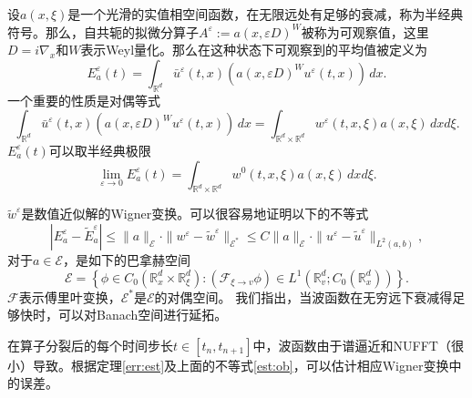 设$a(x,\xi)$是一个光滑的实值相空间函数，在无限远处有足够的衰减，称为半经典符号。那么，自共轭的拟微分算子$A^\varepsilon:=a(x,\varepsilon D)^W$被称为可观察值，这里$D=i\nabla_x$和$W$表示Weyl量化。那么在这种状态下可观察到的平均值被定义为
\begin{equation}
E^\varepsilon_a(t)=\int_{\mathbb{R}^d}\bar{u}^\varepsilon(t,x)(a(x,\varepsilon D)^W u^\varepsilon(t,x))\,dx.
\end{equation}
一个重要的性质是对偶等式
\begin{equation}
\int_{\mathbb{R}^d}\bar{u}^\varepsilon(t,x)(a(x,\varepsilon D)^W u^\varepsilon(t,x))\,dx=\int_{\mathbb{R}^d\times\mathbb{R}^d}w^\varepsilon(t,x,\xi)a(x,\xi)\,dxd\xi.
\end{equation}
$E^\varepsilon_a(t)$可以取半经典极限
\begin{equation}
\lim\limits_{\varepsilon\rightarrow 0}E^\varepsilon_a(t)=\int_{\mathbb{R}^d\times\mathbb{R}^d}w^0(t,x,\xi)a(x,\xi)\,dxd\xi.
\end{equation}

$\tilde{w}^\varepsilon$是数值近似解的Wigner变换。可以很容易地证明以下的不等式
\begin{equation}\label{est:ob}
|E^\varepsilon_a-\tilde{E}^\varepsilon_a|\leq \|a\|_\mathcal{E}\cdot \|w^\varepsilon-\tilde{w}^\varepsilon\|_{\mathcal{E}^*}\leq C\|a\|_\mathcal{E}\cdot \|u^\varepsilon-\tilde{u}^\varepsilon\|_{L^2(a,b)},
\end{equation}
对于$a\in\mathcal{E}$，是如下的巴拿赫空间
\[
\mathcal{E}=\left\{\phi\in C_0(\mathbb{R}_x^d\times\mathbb{R}_\xi^d):(\mathcal{F}_{\xi\rightarrow v}\phi)\in L^1(\mathbb{R}^d_v;C_0(\mathbb{R}^d_x))\right\}.
\]
$\mathcal{F}$表示傅里叶变换，$\mathcal{E}^*$是$\mathcal{E}$的对偶空间。 我们指出，当波函数在无穷远下衰减得足够快时，可以对Banach空间进行延拓。

在算子分裂后的每个时间步长$t\in[t_n,t_{n+1}]$中，波函数由于谱逼近和NUFFT（很小）导致。根据定理\ref{err:est}及上面的不等式\eqref{est:ob}，可以估计相应Wigner变换中的误差。

